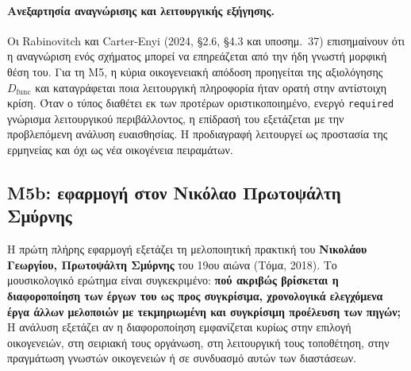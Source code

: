 \documentclass[11pt,a4paper]{article}
\begin{document}
\paragraph{Ανεξαρτησία αναγνώρισης και λειτουργικής εξήγησης.} Οι Rabinovitch και Carter-Enyi (2024, §2.6, §4.3 και υποσημ.~37) επισημαίνουν ότι η αναγνώριση ενός σχήματος μπορεί να επηρεάζεται από την ήδη γνωστή μορφική θέση του. Για τη M5, η κύρια οικογενειακή απόδοση προηγείται της αξιολόγησης $D_{\mathrm{func}}$ και καταγράφεται ποια λειτουργική πληροφορία ήταν ορατή στην αντίστοιχη κρίση. Όταν ο τύπος διαθέτει εκ των προτέρων οριστικοποιημένο, ενεργό \texttt{required} γνώρισμα λειτουργικού περιβάλλοντος, η επίδρασή του εξετάζεται με την προβλεπόμενη ανάλυση ευαισθησίας. Η προδιαγραφή λειτουργεί ως προστασία της ερμηνείας και όχι ως νέα οικογένεια πειραμάτων.

\subsection{M5b: εφαρμογή στον Νικόλαο Πρωτοψάλτη Σμύρνης}\label{sec:m5-nikolaos}

Η πρώτη πλήρης εφαρμογή εξετάζει τη μελοποιητική πρακτική του \textbf{Νικολάου Γεωργίου, Πρωτοψάλτη Σμύρνης} του 19ου αιώνα (Τόμα, 2018). Το μουσικολογικό ερώτημα είναι συγκεκριμένο: \textbf{πού ακριβώς βρίσκεται η διαφοροποίηση των έργων του ως προς συγκρίσιμα, χρονολογικά ελεγχόμενα έργα άλλων μελοποιών με τεκμηριωμένη και συγκρίσιμη προέλευση των πηγών;} Η ανάλυση εξετάζει αν η διαφοροποίηση εμφανίζεται κυρίως στην επιλογή οικογενειών, στη σειριακή τους οργάνωση, στη λειτουργική τους τοποθέτηση, στην πραγμάτωση γνωστών οικογενειών ή σε συνδυασμό αυτών των διαστάσεων.
\end{document}
